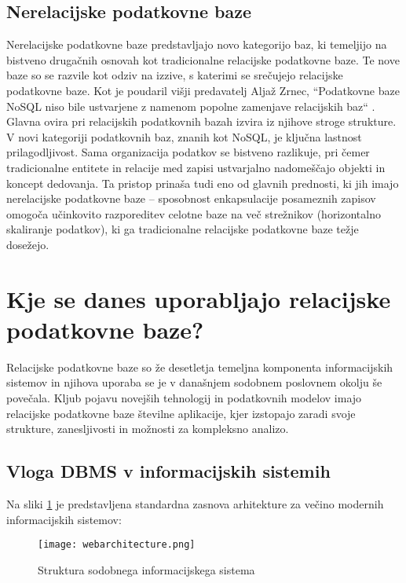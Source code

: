 \documentclass[a4paper,12pt,openright]{book}
\begin{document}
        \subsection{Nerelacijske podatkovne baze}
        Nerelacijske podatkovne baze predstavljajo novo kategorijo baz, ki temeljijo na bistveno drugačnih osnovah kot tradicionalne relacijske podatkovne baze. Te nove baze so se razvile kot odziv na izzive, s katerimi se srečujejo relacijske podatkovne baze. Kot je poudaril višji predavatelj Aljaž Zrnec, ``Podatkovne baze NoSQL niso bile ustvarjene z namenom popolne zamenjave relacijskih baz`` \cite{zrnec2011podatkovne}. Glavna ovira pri relacijskih podatkovnih bazah izvira iz njihove stroge strukture. V novi kategoriji podatkovnih baz, znanih kot NoSQL, je ključna lastnost prilagodljivost. Sama organizacija podatkov se bistveno razlikuje, pri čemer tradicionalne entitete in relacije med zapisi ustvarjalno nadomeščajo objekti in koncept dedovanja. Ta pristop prinaša tudi eno od glavnih prednosti, ki jih imajo nerelacijske podatkovne baze – sposobnost enkapsulacije posameznih zapisov omogoča učinkovito razporeditev celotne baze na več strežnikov (horizontalno skaliranje podatkov), ki ga tradicionalne relacijske podatkovne baze težje dosežejo.
    
    \section{Kje se danes uporabljajo relacijske podatkovne baze?}

    Relacijske podatkovne baze so že desetletja temeljna komponenta informacijskih sistemov in njihova uporaba se je v današnjem sodobnem poslovnem okolju še povečala. Kljub pojavu novejših tehnologij in podatkovnih modelov imajo relacijske podatkovne baze številne aplikacije, kjer izstopajo zaradi svoje strukture, zanesljivosti in možnosti za kompleksno analizo.

    \newpage
    \subsection{Vloga DBMS v informacijskih sistemih}

    Na sliki \ref{infsistem} je predstavljena standardna zasnova arhitekture za večino modernih informacijskih sistemov:
    \begin{figure}[h]
        \centerline{\texttt{[image: webarchitecture.png]}}
        \caption{Struktura sodobnega informacijskega sistema}
        \label{infsistem}
    \end{figure}
\end{document}
